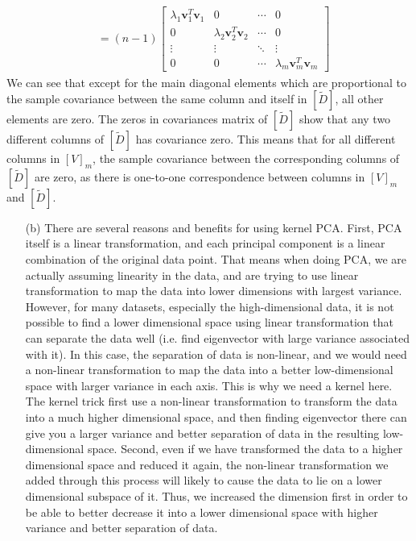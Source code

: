 \documentclass[11pt]{article}
\renewcommand{\vec}[1]{\mathbf{#1}}
\begin{document}
\begin{answertext}{22cm}{}
\begin{align*}
&= (n-1)
\begin{bmatrix}
\lambda_1 \vec{v}_1^T \vec{v}_1 & 0 & \cdots & 0\\
0 & \lambda_2 \vec{v}_2^T \vec{v}_2 & \cdots & 0\\
\vdots & \vdots & \ddots & \vdots\\
0 & 0 & \cdots & \lambda_m \vec{v}_m^T \vec{v}_m
\end{bmatrix}
\end{align*}
We can see that except for the main diagonal elements which are proportional to the sample covariance between the same column and itself in $[\tilde{D}]$, all other elements are zero. The zeros in covariances matrix of $[\tilde{D}]$ show that any two different columns of $[\tilde{D}]$ has covariance zero. This means that for all different columns in $[V]_m$, the sample covariance between the corresponding columns of $[\tilde{D}]$
are zero, as there is one-to-one correspondence between columns in $[V]_m$ and $[\tilde{D}]$. 
\end{answertext}
\begin{answertext}{14cm}{}
\begin{enumerate}
\item[(b)] There are several reasons and benefits for using kernel PCA. First, PCA itself is a linear transformation, and each principal component is a linear combination of the original data point. That means when doing PCA, we are actually assuming linearity in the data, and are trying to use linear transformation to map the data into lower dimensions with largest variance. However, for many datasets, especially the high-dimensional data, it is not possible to find a lower dimensional space using linear transformation that can separate the data well (i.e. find eigenvector with large variance associated with it). In this case, the separation of data is non-linear, and we would need a non-linear transformation to map the data into a better low-dimensional space with larger variance in each axis. This is why we need a kernel here. The kernel trick first use a non-linear transformation to transform the data into a much higher dimensional space, and then finding eigenvector there can give you a larger variance and better separation of data in the resulting low-dimensional space. Second, even if we have transformed the data to a higher dimensional space and reduced it again, the non-linear transformation we added through this process will likely to cause the data to lie on a lower dimensional subspace of it. Thus, we increased the dimension first in order to be able to better decrease it into a lower dimensional space with higher variance and better separation of data.
\end{enumerate}
\end{answertext}

\pagebreak

\end{document}
